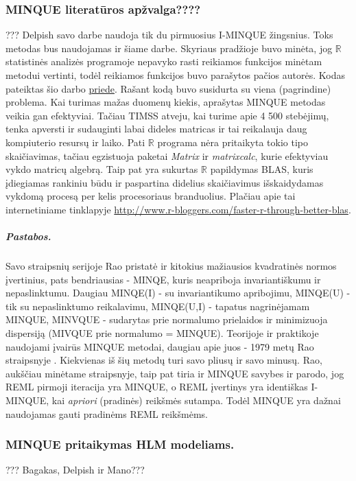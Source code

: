 \documentclass[12pt,a4paper]{article}
\newcommand{\R}{{\mathbb R}}
\begin{document}
\subsubsection{MINQUE literatūros apžvalga????}



\indent ??? Delpish\cite{delpish} savo darbe naudoja tik du pirmuosius I-MINQUE žingsnius. Toks metodas bus naudojamas ir šiame darbe.  Skyriaus pradžioje buvo minėta, jog $\R$ statistinės analizės programoje nepavyko rasti reikiamos funkcijos minėtam metodui vertinti, todėl reikiamos funkcijos buvo parašytos pačios autorės. Kodas pateiktas šio darbo \hyperlink{appendix}{priede}. Rašant kodą buvo susidurta su viena (pagrindine) problema. Kai turimas mažas duomenų kiekis, aprašytas MINQUE metodas veikia gan efektyviai. Tačiau TIMSS atveju, kai turime apie 4 500 stebėjimų, tenka apversti ir sudauginti labai dideles matricas ir tai reikalauja daug kompiuterio resursų ir laiko. Pati $\R$ programa nėra pritaikyta tokio tipo skaičiavimas, tačiau egzistuoja paketai \textit{Matrix} ir \textit{matrixcalc}, kurie efektyviau vykdo matricų algebrą. Taip pat yra sukurtas $\R$ papildymas BLAS, kuris įdiegiamas rankiniu būdu ir paspartina didelius skaičiavimus išskaidydamas vykdomą procesą per kelis procesoriaus branduolius. Plačiau apie tai internetiniame tinklapyje \url{http://www.r-bloggers.com/faster-r-through-better-blas}.


\subparagraph{Pastabos.} Savo straipsnių serijoje Rao pristatė ir kitokius mažiausios kvadratinės normos įvertinius, pats bendriausias - MINQE, kuris neapriboja invariantiškumu ir nepaslinktumu. Daugiau MINQE(I) - su invariantikumo apribojimu, MINQE(U) - tik su nepaslinktumo reikalavimu, MINQE(U,I) - tapatus nagrinėjamam MINQUE, MINVQUE - sudarytas prie normalumo prielaidos ir minimizuoja dispersiją (MIVQUE prie normalumo = MINQUE). Teorijoje ir praktikoje naudojami įvairūs MINQUE metodai, daugiau apie juos - 1979 metų Rao straipsnyje \cite{minquereml3}. Kiekvienas iš šių metodų turi savo pliusų ir savo minusų. Rao, aukščiau minėtame straipsnyje, taip pat tiria ir MINQUE savybes ir parodo, jog REML pirmoji iteracija yra MINQUE, o REML įvertinys yra identiškas I-MINQUE, kai \textit{apriori} (pradinės) reikšmės sutampa. Todėl MINQUE yra dažnai naudojamas gauti pradinėms REML reikšmėms.


\subsubsection{MINQUE pritaikymas HLM modeliams.}
??? Bagakas, Delpish ir Mano???
\end{document}
